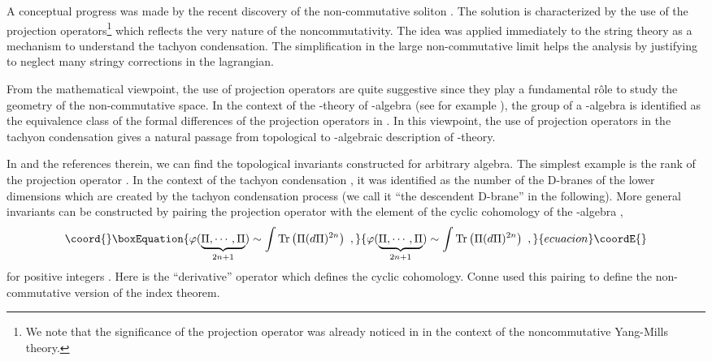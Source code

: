 \documentclass[a4paper,12pt]{article}
\begin{document}
A conceptual progress was made by the recent discovery of the 
non-commutative soliton \cite{r:GMS}.
The solution is characterized by the use of  the projection
operators\footnote{
We note that the significance of the projection operator
was already noticed in \cite{r:Fu} in the context
of the noncommutative Yang-Mills theory.
}
which reflects the very nature of the noncommutativity.
The idea was applied immediately \cite{r:Chicago}\cite{r:Indian} 
to the string theory as a mechanism to understand
the tachyon condensation.
The simplification in the large non-commutative
limit helps the analysis by justifying to neglect
many stringy corrections in the lagrangian.


{}From the mathematical viewpoint, the use of projection operators
are quite suggestive since they play a fundamental r\^ole 
to study the geometry of the non-commutative space.
In the context of the \coordHE{}-theory of \coordHE{}-algebra 
(see for example \cite{r:WO}),
the \coordHE{} group of a \coordHE{}-algebra \coordHE{} is identified as the
equivalence class of the  formal differences 
of the projection operators in 
\coordHE{}. In this viewpoint, the use of projection operators
in the tachyon condensation gives a natural passage
from topological to \coordHE{}-algebraic description of \coordHE{}-theory.


In \cite{r:Conne} and the references therein, we can find
the  topological invariants constructed for arbitrary 
\coordHE{} algebra.  The simplest example is
the rank \coordHE{} of the projection operator \myHighlight{$\Pi$}\coordHE{}.
In the context of the tachyon condensation \cite{r:Chicago},
it was identified as the number of 
the D-branes of the lower dimensions 
which are created by the tachyon condensation process
(we call it ``the descendent D-brane'' in the following).
More general invariants can be constructed by
pairing the projection operator with the element \myHighlight{$\varphi$}\coordHE{}
of the cyclic cohomology of the \coordHE{}-algebra \coordHE{},
\begin{equation}\coord{}\boxEquation{\label{invariants}
\varphi(\underbrace{\Pi,\cdots,\Pi}_{2n+1})\sim \int \mbox{Tr}\left(\Pi (d\Pi)^{2n}\right)\,\,,
}{\varphi(\underbrace{\Pi,\cdots,\Pi}_{2n+1})\sim \int \mbox{Tr}\left(\Pi (d\Pi)^{2n}\right)\,\,,
}{ecuacion}\coordE{}\end{equation}
for positive integers \coordHE{}. Here \coordHE{} is the ``derivative''
operator which defines the cyclic cohomology.
Conne used this pairing to define the non-commutative
version of the index theorem. 
\end{document}
